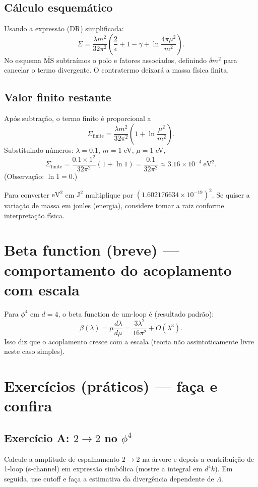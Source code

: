 \documentclass[12pt,a4paper]{article}
\begin{document}
\subsection{Cálculo esquemático}
Usando a expressão (DR) simplificada:
\begin{equation}
\Sigma = \frac{\lambda m^2}{32\pi^2} \left(\frac{2}{\epsilon} + 1 - \gamma + \ln\frac{4\pi\mu^2}{m^2}\right).
\end{equation}
No esquema \(\overline{\text{MS}}\) subtraímos o polo e fatores associados, definindo \(\delta m^2\) para cancelar o termo divergente. O contratermo deixará a massa física finita.

\subsection{Valor finito restante}
Após subtração, o termo finito é proporcional a
\begin{equation}
\Sigma_{\text{finite}} = \frac{\lambda m^2}{32\pi^2} \left(1 + \ln\frac{\mu^2}{m^2}\right).
\end{equation}
Substituindo números: \(\lambda=0.1\), \(m=1\) eV, \(\mu=1\) eV,
\[
\Sigma_{\text{finite}} = \frac{0.1\times 1^2}{32\pi^2} (1 + \ln 1) = \frac{0.1}{32\pi^2} \approx 3.16\times10^{-4}\ \mathrm{eV}^2.
\]
(Observação: \(\ln 1 = 0\).)

Para converter \(\mathrm{eV}^2\) em \(\mathrm{J}^2\) multiplique por \((1.602176634\times10^{-19})^2\). Se quiser a variação de massa em joules (energia), considere tomar a raiz conforme interpretação física.

\section{Beta function (breve) — comportamento do acoplamento com escala}
Para \(\phi^4\) em \(d=4\), o beta function de um-loop é (resultado padrão):
\begin{equation}
\beta(\lambda) = \mu \frac{d\lambda}{d\mu} = \frac{3\lambda^2}{16\pi^2} + O(\lambda^3).
\end{equation}
Isso diz que o acoplamento cresce com a escala (teoria não assintoticamente livre neste caso simples).

\section{Exercícios (práticos) — faça e confira}
\subsection{Exercício A: \(2\to2\) no \(\phi^4\)}
Calcule a amplitude de espalhamento \(2\to2\) na árvore e depois a contribuição de 1-loop (s-channel) em expressão simbólica (mostre a integral em \(d^4k\)). Em seguida, use cutoff e faça a estimativa da divergência dependente de \(\Lambda\).
\end{document}
